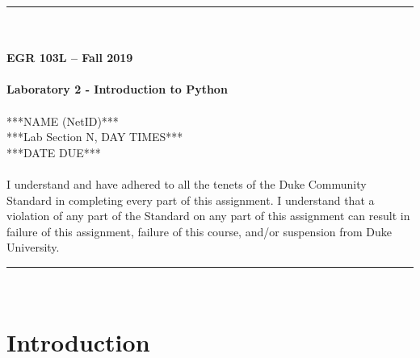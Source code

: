 \documentclass{article}
\begin{document}
\begin{center}
\rule{6.5in}{0.5mm}\\~\\
\textbf{\large EGR 103L -- Fall 2019}\\~\\
\textbf{\huge Laboratory 2 - Introduction to Python}\\~\\
***NAME (NetID)***\\
***Lab Section N, DAY TIMES***\\
***DATE DUE***\\~\\
{\small I understand and have adhered to all the tenets of the Duke
  Community Standard in completing every part of this assignment.  I
  understand that a violation of any part of the Standard on any part
  of this assignment can result in failure of this assignment, failure
  of this course, and/or suspension from Duke University.} 
\rule{6.5in}{0.5mm}\\
\end{center}
\tableofcontents
\listoffigures
\pagebreak
\section{Introduction}
\end{document}
